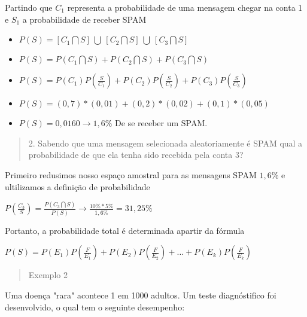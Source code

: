\documentclass{article}
\begin{document}
    Partindo que $ C_1 $ representa a probabilidade de uma mensagem chegar na conta 1 e $ S_1 $ a probabilidade de receber SPAM
    \begin{center}
    \begin{itemize}
      \item $ P(S) = [ C_1 \bigcap S ]\  \bigcup  \ [ C_2 \bigcap S ]\  \bigcup \ [ C_3 \bigcap S ]  $
      \item $ P(S) = P( C_1 \bigcap S ) + P( C_2 \bigcap S ) + P( C_3 \bigcap S )  $
      \item $ P(S) = P(C_1) P( \frac{S}{C_1} ) + P(C_2) P( \frac{S}{C_2} ) + P(C_3) P( \frac{S}{C_3} ) $
      \item $ P(S) = (0,7)*(0,01) + (0,2)*(0,02) + (0,1)*(0,05) $
      \item $ P(S) = 0,0160 \rightarrow 1,6\% $ De se receber um SPAM.
    \end{itemize}
    \end{center}

    \begin{quote}
      2. Sabendo que uma mensagem selecionada aleatoriamente é SPAM qual a probabilidade de que
      ela tenha sido recebida pela conta 3? 
    \end{quote}

    Primeiro redusimos nosso espaço amostral para as mensagens SPAM $ 1,6\% $ e ultilizamos a definição
    de probabilidade 

    \begin{center}
      \begin{large}
        $ P(\frac{C_3}{S}) = \frac{P(C_3 \bigcap S)}{P(S)} \rightarrow  \frac{10\% * 5\%}{1,6\%} = 31,25\% $
      \end{large}
      \end{center}

    Portanto, a probabilidade total é determinada apartir da fórmula
    
    \begin{center}
          $ P(S) = P(E_1) P( \frac{F}{E_1}) + P(E_2) P( \frac{F}{E_2}) + \dots + P(E_k) P( \frac{F}{E_k})  $
    \end{center}
    
    \begin{quote}
      Exemplo 2
    \end{quote}

    Uma doença "rara" acontece 1 em 1000 adultos. Um teste diagnóstifico foi desenvolvido,
    o qual tem o seguinte desempenho:
\end{document}
